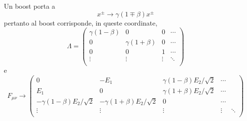 Un boost porta a 
\[ x^{\pm} \rightarrow \gamma(1\mp\beta) x^{\pm} \]
pertanto al boost corrisponde, in queste coordinate, 
\[ \Lambda =
\begin{pmatrix}
	\gamma(1-\beta) & 0               & 0      &\cdots  \\
	0               & \gamma(1+\beta) & 0      & \cdots  \\       
	0               & 0               & 1      & \cdots \\
	\vdots          & \vdots          & \vdots & \ddots \\
\end{pmatrix} 
\]
e
\[ F_{\mu\nu} \rightarrow 
\begin{pmatrix} 
	0                             &  -E_1                & \gamma(1-\beta) E_2/\sqrt{2} & \cdots \\
	E_1                           &  0                   & \gamma(1+\beta) E_2/\sqrt{2} & \cdots \\      
	-\gamma(1-\beta)E_2/\sqrt{2}  & -\gamma(1+\beta)E_2/\sqrt{2}       & 0           & \cdots \\
	\vdots        & \vdots        & \vdots        & \vdots                       & \ddots \\
\end{pmatrix}
\]


